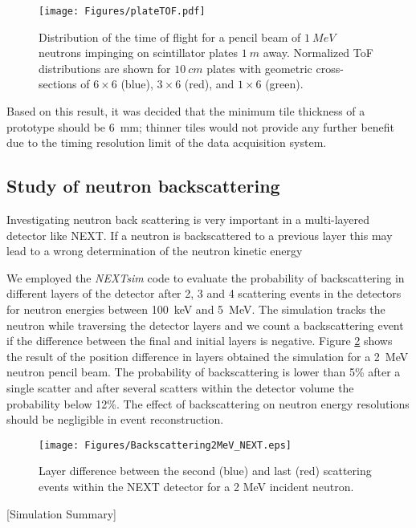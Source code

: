 \begin{figure}[tb]
\centering
\texttt{[image: Figures/plateTOF.pdf]}
\caption{Distribution of the time of flight for a pencil beam of $1~MeV$ neutrons impinging on scintillator plates $1~m$ away. Normalized ToF distributions are shown for $10~cm$ plates with geometric cross-sections of $6 \times 6$ (blue), $3 \times 6$ (red), and $1 \times 6$ (green).}
\label{fig:plateTOF}
\end{figure}
Based on this result, it was decided that the minimum tile thickness of a prototype should be 6~mm; thinner tiles would not provide any further benefit due to the timing resolution limit of the data acquisition system.

\subsection{Study of neutron backscattering}

Investigating neutron back scattering is very important in a multi-layered detector like NEXT. If a neutron is backscattered to a previous layer this may lead to a wrong determination  of the neutron kinetic energy 

We employed the \emph{NEXTsim} code to evaluate the probability of backscattering in different layers of the detector after 2, 3 and 4 scattering events in the detectors for neutron energies between 100~keV and 5~MeV. The simulation tracks the neutron while traversing the detector layers and we count a backscattering event if the difference between the final and initial layers is negative. Figure  \ref{fig:backscattering} shows the result of the position difference in layers obtained the simulation for a 2~MeV neutron pencil beam. The probability of backscattering is lower than 5\% after a single scatter and after several scatters within the detector volume the probability below 12\%. The effect of backscattering on neutron energy resolutions should be negligible in event reconstruction.

\begin{figure}[tb]
\centering
\texttt{[image: Figures/Backscattering2MeV\_NEXT.eps]}
\caption{Layer difference between the second (blue) and last (red) scattering events within the NEXT detector for a 2 MeV incident neutron.}
\label{fig:backscattering}
\end{figure}

\begin{center}
[Simulation Summary]
\end{center}



%
%
%




